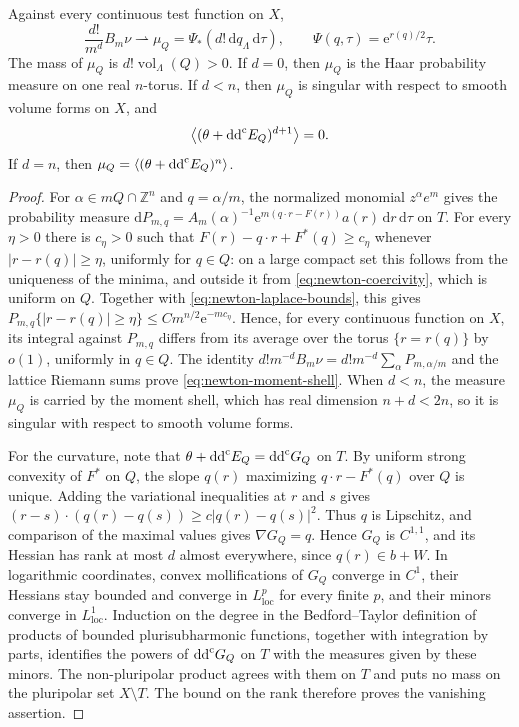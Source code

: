 \begin{theorem}\label{thm:newton-moment-shell-limit}
Against every continuous test function on $X$,
\begin{equation}\label{eq:newton-moment-shell}
 \frac{d!}{m^d}B_m\nu\rightharpoonup
 \mu_Q=\Psi_*(d!\,\mathrm dq_\Lambda\,\mathrm d\tau),
 \qquad \Psi(q,\tau)=\mathrm e^{r(q)/2}\tau.
\end{equation}
The mass of $\mu_Q$ is $d!\operatorname{vol}_\Lambda(Q)>0$. If $d=0$, then $\mu_Q$ is the Haar probability measure on one real $n$-torus. If $d<n$, then $\mu_Q$ is singular with respect to smooth volume forms on $X$, and
\[
 \left\langle(\theta+\mathrm{dd}^{\mathrm{c}} E_Q)^{d+1}\right\rangle=0.
\]
If $d=n$, then $\mu_Q=\langle(\theta+\mathrm{dd}^{\mathrm{c}} E_Q)^n\rangle$.
\end{theorem}
\begin{proof}
For $\alpha\in mQ\cap\mathbb Z^n$ and $q=\alpha/m$, the normalized monomial $z^\alpha e^m$ gives the probability measure
$\mathrm dP_{m,q}=A_m(\alpha)^{-1}
\mathrm e^{m(q\cdot r-F(r))}a(r)\,\mathrm dr\,\mathrm d\tau$ on $T$.
For every $\eta>0$ there is $c_\eta>0$ such that
$F(r)-q\cdot r+F^*(q)\geq c_\eta$ whenever
$|r-r(q)|\geq\eta$, uniformly for $q\in Q$: on a large compact set this follows from the uniqueness of the minima, and outside it from
\eqref{eq:newton-coercivity}, which is uniform on $Q$. Together with \eqref{eq:newton-laplace-bounds}, this gives
$P_{m,q}\{|r-r(q)|\geq\eta\}\leq C m^{n/2}\mathrm e^{-mc_\eta}$.
Hence, for every continuous function on $X$, its integral against $P_{m,q}$ differs from its average over the torus $\{r=r(q)\}$ by $o(1)$, uniformly in $q\in Q$. The identity
$d!m^{-d}B_m\nu=d!m^{-d}\sum_\alpha P_{m,\alpha/m}$ and the
lattice Riemann sums prove \eqref{eq:newton-moment-shell}. When $d<n$, the measure $\mu_Q$ is carried by the moment shell, which has real dimension $n+d<2n$, so it is singular with respect to smooth volume forms.

For the curvature, note that $\theta+\mathrm{dd}^{\mathrm{c}} E_Q=\mathrm{dd}^{\mathrm{c}} G_Q$ on $T$. By uniform strong convexity of $F^*$ on $Q$, the slope $q(r)$ maximizing $q\cdot r-F^*(q)$ over $Q$ is unique. Adding the variational inequalities at $r$ and $s$ gives
$(r-s)\cdot(q(r)-q(s))\geq c|q(r)-q(s)|^2$.
Thus $q$ is Lipschitz, and comparison of the maximal values gives
$\nabla G_Q=q$. Hence $G_Q$ is $C^{1,1}$, and its Hessian
has rank at most $d$ almost everywhere, since $q(r)\in b+W$.
In logarithmic coordinates, convex mollifications of $G_Q$ converge in $C^1$,
their Hessians stay bounded and converge in $L^p_{\mathrm{loc}}$ for every finite $p$,
and their minors converge in $L^1_{\mathrm{loc}}$. Induction on the degree in the Bedford--Taylor definition of products of bounded plurisubharmonic functions, together with integration by parts, identifies the powers of $\mathrm{dd}^{\mathrm{c}} G_Q$ on $T$
with the measures given by these minors. The non-pluripolar product agrees with them on $T$ and
puts no mass on the pluripolar set $X\setminus T$. The bound on the rank therefore proves the
vanishing assertion.


\end{proof}
